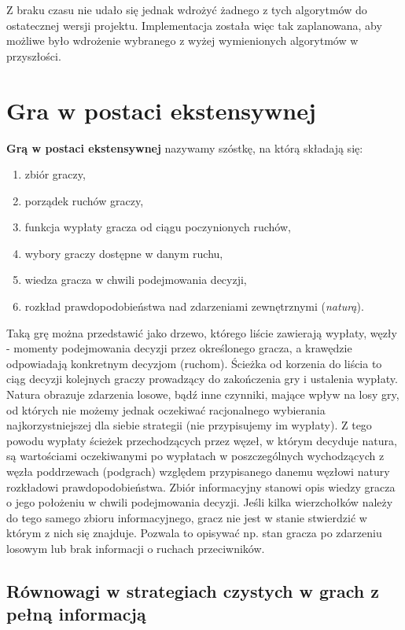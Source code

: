 \documentclass[polish]{standalone}
\begin{document}
Z braku czasu nie udało się jednak wdrożyć żadnego z tych algorytmów do ostatecznej wersji projektu. Implementacja
została więc tak zaplanowana, aby możliwe było wdrożenie wybranego z wyżej wymienionych algorytmów w przyszłości.

\section{Gra w postaci ekstensywnej}

\begin{definition}
\textbf{Grą w postaci ekstensywnej} nazywamy szóstkę, na którą składają się:
\begin{enumerate}
\item zbiór graczy,
\item porządek ruchów graczy,
\item funkcja wypłaty gracza od ciągu poczynionych ruchów,
\item wybory graczy dostępne w danym ruchu,
\item wiedza gracza w chwili podejmowania decyzji,
\item rozkład prawdopodobieństwa nad zdarzeniami zewnętrznymi (\textit{naturą}).
\end{enumerate}
\cite[str.~77--78]{FT-GT}
\end{definition}

Taką grę można przedstawić jako drzewo, którego liście zawierają wypłaty, węzły - momenty podejmowania decyzji przez
określonego gracza, a krawędzie odpowiadają konkretnym decyzjom (ruchom). Ścieżka od korzenia do liścia to ciąg decyzji
kolejnych graczy prowadzący do zakończenia gry i ustalenia wypłaty. Natura obrazuje zdarzenia losowe, bądź inne
czynniki, mające wpływ na losy gry, od których nie możemy jednak oczekiwać racjonalnego wybierania najkorzystniejszej
dla siebie strategii (nie przypisujemy im wypłaty). Z tego powodu wypłaty ścieżek przechodzących przez węzeł, w którym
decyduje natura, są wartościami oczekiwanymi po wypłatach w poszczególnych wychodzących z węzła poddrzewach (podgrach)
względem przypisanego danemu węzłowi natury rozkładowi prawdopodobieństwa. Zbiór informacyjny stanowi opis wiedzy
gracza o jego położeniu w chwili podejmowania decyzji. Jeśli kilka wierzchołków należy do tego samego zbioru
informacyjnego, gracz nie jest w stanie stwierdzić w którym z nich się znajduje. Pozwala to opisywać np. stan gracza po
zdarzeniu losowym lub brak informacji o ruchach przeciwników.

\subsection{Równowagi w strategiach czystych w grach z pełną informacją}
\end{document}
